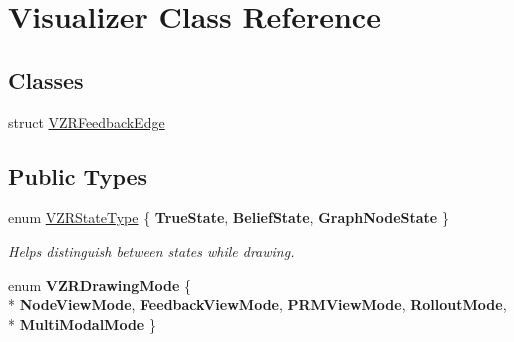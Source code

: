 \hypertarget{class_visualizer}{\section{Visualizer Class Reference}
\label{class_visualizer}
}
\subsection*{Classes}
\begin{DoxyCompactItemize}
\item 
struct \hyperlink{struct_visualizer_1_1_v_z_r_feedback_edge}{V\-Z\-R\-Feedback\-Edge}
\end{DoxyCompactItemize}
\subsection*{Public Types}
\begin{DoxyCompactItemize}
\item 
enum \hyperlink{class_visualizer_a2710d7bdd6700c034876a3c43c328cd7}{V\-Z\-R\-State\-Type} \{ {\bfseries True\-State}, 
{\bfseries Belief\-State}, 
{\bfseries Graph\-Node\-State}
 \}
\begin{DoxyCompactList}\small\item\em Helps distinguish between states while drawing. \end{DoxyCompactList}\item 
enum {\bfseries V\-Z\-R\-Drawing\-Mode} \{ \\*
{\bfseries Node\-View\-Mode}, 
{\bfseries Feedback\-View\-Mode}, 
{\bfseries P\-R\-M\-View\-Mode}, 
{\bfseries Rollout\-Mode}, 
\\*
{\bfseries Multi\-Modal\-Mode}
 \}
\end{DoxyCompactItemize}
